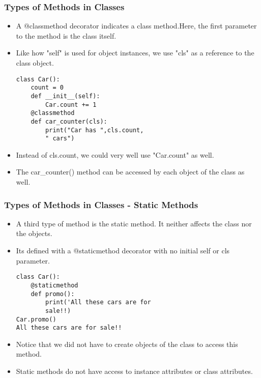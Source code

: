 \documentclass{beamer}
\begin{document}
\begin{frame}[fragile]
\frametitle{Types of Methods in Classes}
\begin{itemize}
\item A @classmethod decorator indicates a class method.Here, the first parameter to the method is the class itself.
\item Like how "self" is used for object instances, we use "cls" as a reference to the class object.
\begin{lstlisting}
class Car():
	count = 0
	def __init__(self):
		Car.count += 1
	@classmethod
	def car_counter(cls):
		print("Car has ",cls.count, 
		" cars")       
\end{lstlisting}
\item Instead of cls.count, we could very well use "Car.count" as well.
\item The car\_counter() method can be accessed by each object of the class as well.
\end{itemize}
\end{frame}

\begin{frame}[fragile]
\frametitle{Types of Methods in Classes - Static Methods}
\begin{itemize}
\item A third type of method is the static  method. It neither affects the class nor the objects.
\item Its defined with a @staticmethod decorator with no initial self or cls parameter.
\begin{lstlisting}
class Car():
	@staticmethod
	def promo():
		print('All these cars are for 
		sale!!)
Car.promo()
All these cars are for sale!!
\end{lstlisting}
\item Notice that we did not have to create objects of the class to access this method.
\item Static methods do not have access to instance attributes or class attributes.
\end{itemize}
\end{frame}
\end{document}
